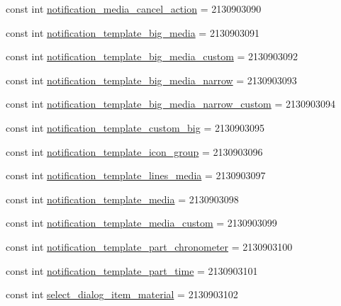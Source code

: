 \begin{CompactItemize}
\item 
const int \hyperlink{class__2doo_1_1_droid_1_1_resource_1_1_layout_27bc96320fda5c7395263fbb152a6899}{notification\_\-media\_\-cancel\_\-action} = 2130903090
\item 
const int \hyperlink{class__2doo_1_1_droid_1_1_resource_1_1_layout_07caf2f6e8126efddffae49df0853bcd}{notification\_\-template\_\-big\_\-media} = 2130903091
\item 
const int \hyperlink{class__2doo_1_1_droid_1_1_resource_1_1_layout_befcd534a531ee7742209b34dc3fc830}{notification\_\-template\_\-big\_\-media\_\-custom} = 2130903092
\item 
const int \hyperlink{class__2doo_1_1_droid_1_1_resource_1_1_layout_e0b42909b86b6e51d3dfff9af0e55d14}{notification\_\-template\_\-big\_\-media\_\-narrow} = 2130903093
\item 
const int \hyperlink{class__2doo_1_1_droid_1_1_resource_1_1_layout_ce184925b01ac1fd08d201b9830c6f6c}{notification\_\-template\_\-big\_\-media\_\-narrow\_\-custom} = 2130903094
\item 
const int \hyperlink{class__2doo_1_1_droid_1_1_resource_1_1_layout_c1351012bb0976c09482fb1861d3a691}{notification\_\-template\_\-custom\_\-big} = 2130903095
\item 
const int \hyperlink{class__2doo_1_1_droid_1_1_resource_1_1_layout_1fabc258c828cd7679735530f084be6d}{notification\_\-template\_\-icon\_\-group} = 2130903096
\item 
const int \hyperlink{class__2doo_1_1_droid_1_1_resource_1_1_layout_f6f174cc14ad00ee42576a43a2f02ad4}{notification\_\-template\_\-lines\_\-media} = 2130903097
\item 
const int \hyperlink{class__2doo_1_1_droid_1_1_resource_1_1_layout_9399a3dba9f602a76e9e9379b7d1e3d4}{notification\_\-template\_\-media} = 2130903098
\item 
const int \hyperlink{class__2doo_1_1_droid_1_1_resource_1_1_layout_d9c4acba0e9c86ac7ce5a5d5c987b848}{notification\_\-template\_\-media\_\-custom} = 2130903099
\item 
const int \hyperlink{class__2doo_1_1_droid_1_1_resource_1_1_layout_c952d451a2f98848b71c4039d3b732c4}{notification\_\-template\_\-part\_\-chronometer} = 2130903100
\item 
const int \hyperlink{class__2doo_1_1_droid_1_1_resource_1_1_layout_09e6d1cef15f750debebebac371821d4}{notification\_\-template\_\-part\_\-time} = 2130903101
\item 
const int \hyperlink{class__2doo_1_1_droid_1_1_resource_1_1_layout_712185d2f455eb2d1faf6be0d5ca364e}{select\_\-dialog\_\-item\_\-material} = 2130903102

\end{CompactItemize}
